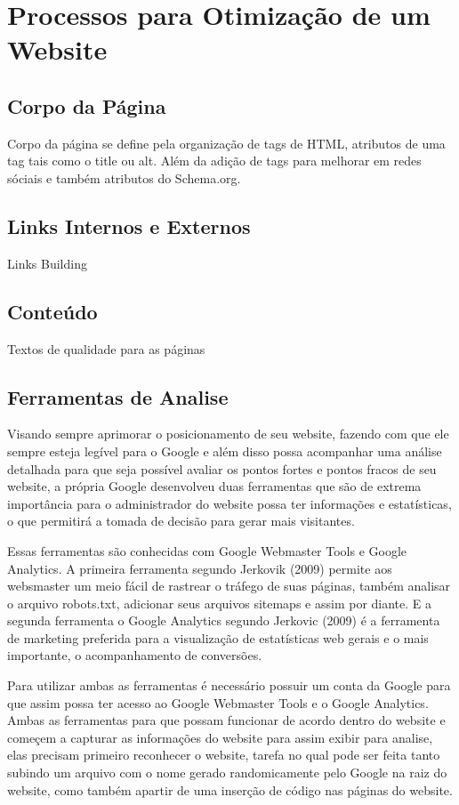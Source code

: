 \documentclass[
	12pt,				%
	openright,			%
	twoside,			%
	a4paper,			%
	english,			%
	french,				%
	spanish,			%
	brazil				%
	]{abntex2}
\begin{document}
\chapter{Processos para Otimização de um Website}

\section{Corpo da Página}

Corpo da página se define pela organização de tags de HTML, atributos de uma tag tais como o title ou alt. Além da adição de tags para melhorar em redes sóciais e também atributos do Schema.org.

\section{Links Internos e Externos}

Links Building

\section{Conteúdo}

Textos de qualidade para as páginas

\section{Ferramentas de Analise}

Visando sempre aprimorar o posicionamento de seu website, fazendo com que ele sempre esteja legível para o Google e além disso possa acompanhar uma análise detalhada para que seja possível avaliar os pontos fortes e pontos fracos de seu website, a própria Google desenvolveu duas ferramentas que são de extrema importância para o administrador do website possa ter informações e estatísticas, o que permitirá a tomada de decisão para gerar mais visitantes.

Essas ferramentas são conhecidas com Google Webmaster Tools e Google Analytics. A primeira ferramenta segundo Jerkovik (2009) permite aos websmaster um meio fácil de rastrear o tráfego de suas páginas, também analisar o arquivo robots.txt, adicionar seus arquivos sitemaps e assim por diante. E a segunda ferramenta o Google Analytics segundo Jerkovic (2009) é a ferramenta de marketing preferida para a visualização de estatísticas web gerais e o mais importante, o acompanhamento de conversões.

Para utilizar ambas as ferramentas é necessário possuir um conta da Google para que assim possa ter acesso ao Google Webmaster Tools e o Google Analytics. Ambas as ferramentas para que possam funcionar de acordo dentro do website e começem a capturar as informações do website para assim exibir para analise, elas precisam primeiro reconhecer o website, tarefa no qual pode ser feita tanto subindo um arquivo com o nome gerado randomicamente pelo Google na raiz do website, como também apartir de uma inserção de código nas páginas do website.
\end{document}
